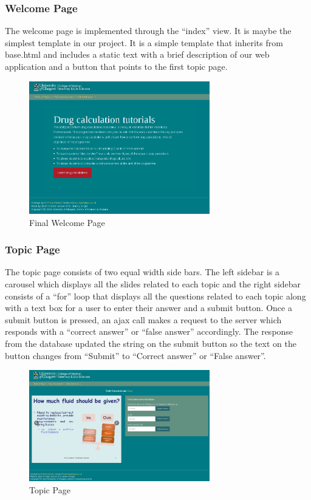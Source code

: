 \documentclass{l3proj}
\begin{document}
{\subsubsection{Welcome Page}
The welcome page is implemented through the “index” view.  It is maybe the simplest template in our project. It is a simple template that inherits from base.html and includes a static text with a brief description of our web application and a button that points to the first topic page.
\begin{figure}[h!]
   \caption{Final Welcome Page}
   \centering
     \includegraphics[width=0.7\textwidth]{images/welcomePage.png}
\end{figure} 

\subsubsection{Topic Page}
The topic page consists of two equal width side bars. The left sidebar is a carousel which displays all the slides related to each topic and the right sidebar  consists of a “for” loop that displays all the questions related to each topic along with a text box for a user to enter their answer and a submit button. Once a submit button is pressed, an ajax call makes a request to the server which responds with a “correct answer” or “false answer” accordingly.  The response from the database updated the string on the submit button so the text on the button changes from “Submit” to “Correct answer” or “False answer”.
\begin{figure}[h!]
   \caption{Topic Page}
   \centering
     \includegraphics[width=0.7\textwidth]{images/topicPage.png}
\end{figure} 

}
\end{document}
